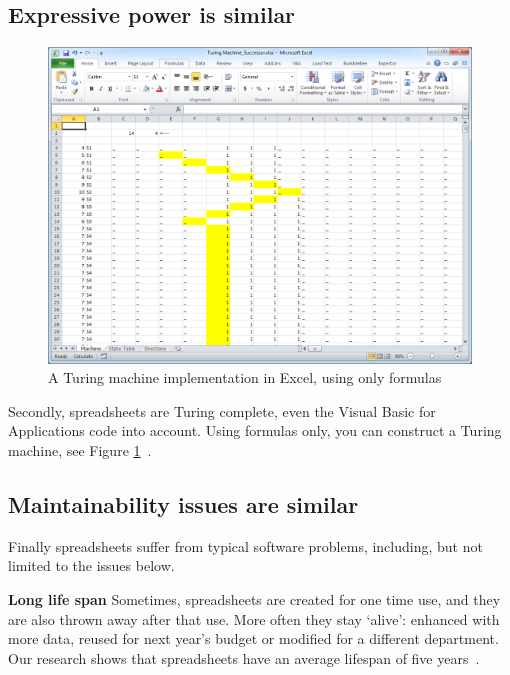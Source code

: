 \documentclass[conference]{IEEEtran}
\begin{document}
\subsection{Expressive power is similar}

\begin{figure}
  \begin{center}
  \includegraphics[width=\columnwidth]{fig/turing.png}
  \caption{A Turing machine implementation in Excel, using only formulas}
  \label{fig:visical}
  \end{center}
\end{figure} 

Secondly, spreadsheets are Turing complete, even  the Visual Basic for Applications code into account. Using formulas only, you can construct a Turing machine, see Figure \ref{fig:visical}~\cite{Turing2013}. 

\subsection{Maintainability issues are similar}

Finally spreadsheets suffer from typical software problems, including, but not limited to the issues below.

\textbf{Long life span} Sometimes, spreadsheets are created for one time use, and they are also thrown away after that use. More often they stay ‘alive’: enhanced with more data, reused for next year's budget or modified for a different department. Our research shows that spreadsheets have an average lifespan of five years~\cite{hermans_supporting_2011}.
\end{document}
